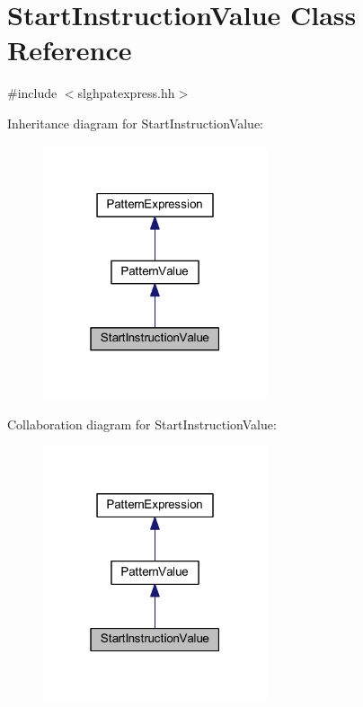 \hypertarget{class_start_instruction_value}{}\section{Start\+Instruction\+Value Class Reference}
\label{class_start_instruction_value}


{\ttfamily \#include $<$slghpatexpress.\+hh$>$}



Inheritance diagram for Start\+Instruction\+Value\+:
\nopagebreak
\begin{figure}[H]
\begin{center}
\leavevmode
\includegraphics[width=187pt]{class_start_instruction_value__inherit__graph}
\end{center}
\end{figure}


Collaboration diagram for Start\+Instruction\+Value\+:
\nopagebreak
\begin{figure}[H]
\begin{center}
\leavevmode
\includegraphics[width=187pt]{class_start_instruction_value__coll__graph}
\end{center}
\end{figure}
